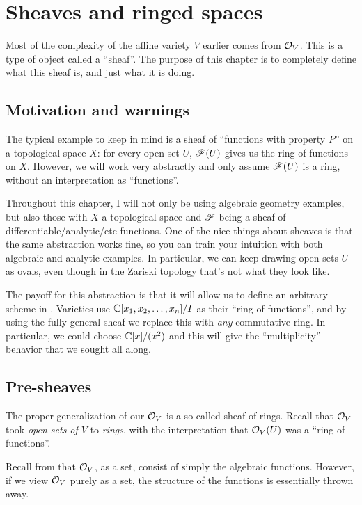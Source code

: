 \chapter{Sheaves and ringed spaces}
\label{ch:sheaves_and_ringed_spaces}
Most of the complexity of the affine variety $V$ earlier comes from $\mathcal O_V$.
This is a type of object called a ``sheaf''.
The purpose of this chapter is to completely define what this sheaf is,
and just what it is doing.

\section{Motivation and warnings}
The typical example to keep in mind is a sheaf of
``functions with property $P$'' on a topological space $X$:
for every open set $U$, $\mathscr F(U)$ gives us the ring of functions on $X$.
However, we will work very abstractly and only assume $\mathscr F(U)$
is a ring, without an interpretation as ``functions''.

Throughout this chapter, I will not only be using algebraic geometry
examples, but also those with $X$ a topological space
and $\mathscr F$ being a sheaf of differentiable/analytic/etc functions.
One of the nice things about sheaves is that the same abstraction works fine,
so you can train your intuition with both algebraic and analytic examples.
In particular, we can keep drawing open sets $U$ as ovals,
even though in the Zariski topology that's not what they look like.

The payoff for this abstraction is that it will
allow us to define an arbitrary scheme in .
Varieties use $\mathbb C[x_1, x_2, \dots, x_n] / I$ as their ``ring of functions'',
and by using the fully general sheaf we replace this
with \emph{any} commutative ring.
In particular, we could choose $\mathbb C[x] / (x^2)$
and this will give the ``multiplicity''
behavior that we sought all along.


\section{Pre-sheaves}

The proper generalization of our $\mathcal O_V$ is a so-called sheaf of rings.
Recall that $\mathcal O_V$ took \emph{open sets of $V$} to \emph{rings},
with the interpretation that $\mathcal O_V(U)$ was a ``ring of functions''.

Recall from  that $\mathcal O_V$, as a set, consist
of simply the algebraic functions. However, if we view $\mathcal O_V$ purely as a set,
the structure of the functions is essentially thrown away.

